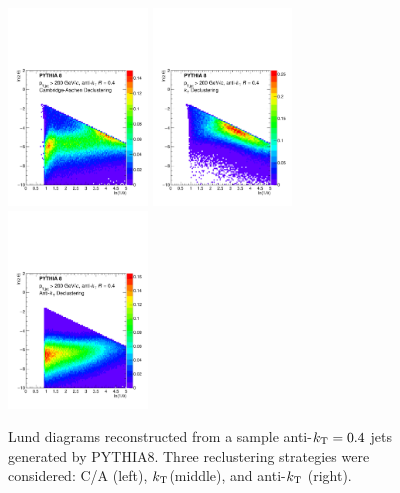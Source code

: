 \begin{figure}[t!]
\centering
\includegraphics[width=0.33\textwidth]{figures/LundMC/Pythia_CA.pdf}%
\includegraphics[width=0.33\textwidth]{figures/LundMC/Pythia_kt.pdf}%
\includegraphics[width=0.33\textwidth]{figures/LundMC/Pythia_Akt.pdf}%
\caption{Lund diagrams reconstructed from a sample anti-$k_{\rm \tiny T} = 0.4$ jets generated by PYTHIA8. Three reclustering strategies were considered: C/A (left), $k_{\rm \tiny T}$(middle), and anti-$k_{\rm \tiny T}$ (right).}
\label{fig:PS2Vac}
\end{figure}
